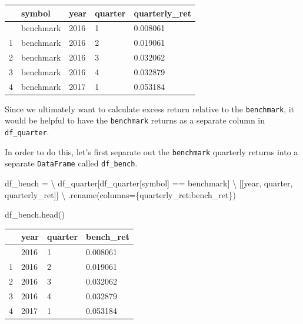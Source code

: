 \documentclass[
  letterpaper,
  DIV=11,
  numbers=noendperiod]{scrreprt}
\newenvironment{Shaded}{\begin{snugshade}}{\end{snugshade}}
\newcommand{\NormalTok}[1]{\textcolor[rgb]{0.00,0.23,0.31}{#1}}
\newcommand{\OperatorTok}[1]{\textcolor[rgb]{0.37,0.37,0.37}{#1}}
\newcommand{\StringTok}[1]{\textcolor[rgb]{0.13,0.47,0.30}{#1}}
\begin{document}
\begin{longtable}[]{@{}lllll@{}}
\toprule\noalign{}
& symbol & year & quarter & quarterly\_ret \\
\midrule\noalign{}
\endhead
\bottomrule\noalign{}
\endlastfoot
0 & benchmark & 2016 & 1 & 0.008061 \\
1 & benchmark & 2016 & 2 & 0.019061 \\
2 & benchmark & 2016 & 3 & 0.032062 \\
3 & benchmark & 2016 & 4 & 0.032879 \\
4 & benchmark & 2017 & 1 & 0.053184 \\
\end{longtable}

Since we ultimately want to calculate excess return relative to the
\texttt{benchmark}, it would be helpful to have the \texttt{benchmark}
returns as a separate column in \texttt{df\_quarter}.

In order to do this, let's first separate out the \texttt{benchmark}
quarterly returns into a separate \texttt{DataFrame} called
\texttt{df\_bench}.

\begin{Shaded}
\begin{Highlighting}[]
\NormalTok{df\_bench }\OperatorTok{=} \OperatorTok{\textbackslash{}}
\NormalTok{    df\_quarter[df\_quarter[}\StringTok{\textquotesingle{}symbol\textquotesingle{}}\NormalTok{] }\OperatorTok{==} \StringTok{\textquotesingle{}benchmark\textquotesingle{}}\NormalTok{] }\OperatorTok{\textbackslash{}}
\NormalTok{    [[}\StringTok{\textquotesingle{}year\textquotesingle{}}\NormalTok{, }\StringTok{\textquotesingle{}quarter\textquotesingle{}}\NormalTok{, }\StringTok{\textquotesingle{}quarterly\_ret\textquotesingle{}}\NormalTok{]] }\OperatorTok{\textbackslash{}}
\NormalTok{    .rename(columns}\OperatorTok{=}\NormalTok{\{}\StringTok{\textquotesingle{}quarterly\_ret\textquotesingle{}}\NormalTok{:}\StringTok{\textquotesingle{}bench\_ret\textquotesingle{}}\NormalTok{\})}

\NormalTok{df\_bench.head()}
\end{Highlighting}
\end{Shaded}

\begin{longtable}[]{@{}llll@{}}
\toprule\noalign{}
& year & quarter & bench\_ret \\
\midrule\noalign{}
\endhead
\bottomrule\noalign{}
\endlastfoot
0 & 2016 & 1 & 0.008061 \\
1 & 2016 & 2 & 0.019061 \\
2 & 2016 & 3 & 0.032062 \\
3 & 2016 & 4 & 0.032879 \\
4 & 2017 & 1 & 0.053184 \\
\end{longtable}
\end{document}
